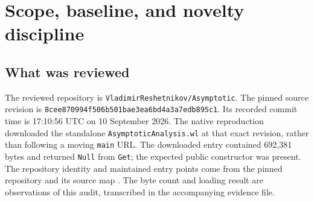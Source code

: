 \documentclass[11pt,letterpaper]{article}
\newcommand{\code}[1]{\texttt{#1}}
\newcommand{\revision}{\texttt{8cee870994f506b501bae3ea6bd4a3a7edb895c1}}
\begin{document}
\begin{abstract}
This audit investigates selected analytic engines, compatibility adapters, result operations, special-function formulas, and validation tooling at a pinned revision of AsymptoticAnalysis. The existing review register, wave-3 and wave-4 intakes, and wave-5 index are used to exclude previously recorded mechanisms. The retained new finding concerns the scope of the \code{SourceShift} option in \code{AsymptoticExponentialCoreInverse}. The constructor excludes the source variable from the shift but does not exclude the requested target variable. Consequently, an admitted change of source coordinates can turn a fixed core amplitude into a target-dependent amplitude. The coefficient recurrence still produces the right displayed approximation, while the fixed-data remainder argument silently treats an unbounded factor as a constant.

The failure is reproduced through the public API in Wolfram 15.0.0. An elementary exact inverse proves that the returned remainder is false, rather than merely conservative or insufficiently documented. An all-orders calculation identifies the missing amplitude factor and supplies explicit shift-independent bounds for a narrow exponential family. A minimal guard replacement is exercised on a downloaded temporary copy of the pinned standalone package; seven focused outcome classifications preserve the intended distinction between source shifts and supplied inverse expressions. Twenty independent Python test methods pass. The accompanying twelve-case MUnit file and portable smoke file are supplied for further acceptance, not represented as executed Mathics or full-suite evidence.
\end{abstract}
\tableofcontents
\newpage

\section{Scope, baseline, and novelty discipline}
\subsection{What was reviewed}
The reviewed repository is \code{VladimirReshetnikov/Asymptotic}. The pinned source revision is\newline
\revision.\newline
Its recorded commit time is 17:10:56 UTC on 10 September 2026. The native reproduction downloaded the standalone \code{AsymptoticAnalysis.wl} at that exact revision, rather than following a moving \code{main} URL. The downloaded entry contained 692,381 bytes and returned \code{Null} from \code{Get}; the expected public constructor was present. The repository identity and maintained entry points come from the pinned repository and its source map \cite{repo,source-map}. The byte count and loading result are observations of this audit, transcribed in the accompanying evidence file.
\end{document}
